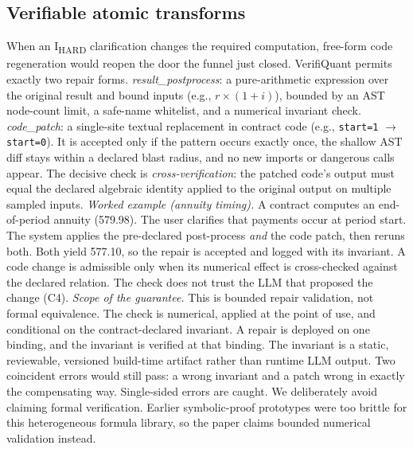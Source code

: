 \subsection{Verifiable atomic transforms}\label{sec:transforms}
When an I\textsubscript{HARD} clarification changes the required computation, free-form code regeneration would reopen the door the funnel just closed.
VerifiQuant permits exactly two repair forms.
\emph{result\_postprocess}: a pure-arithmetic expression over the original result and bound inputs (e.g., $r \times (1+i)$), bounded by an AST node-count limit, a safe-name whitelist, and a numerical invariant check.
\emph{code\_patch}: a single-site textual replacement in contract code (e.g., \texttt{start=1} $\rightarrow$ \texttt{start=0}).
It is accepted only if the pattern occurs exactly once, the shallow AST diff stays within a declared blast radius, and no new imports or dangerous calls appear.
The decisive check is \emph{cross-verification}: the patched code's output must equal the declared algebraic identity applied to the original output on multiple sampled inputs.
\emph{Worked example (annuity timing).} A contract computes an end-of-period annuity (579.98).
The user clarifies that payments occur at period start.
The system applies the pre-declared post-process \emph{and} the code patch, then reruns both.
Both yield 577.10, so the repair is accepted and logged with its invariant.
A code change is admissible only when its numerical effect is cross-checked against the declared relation.
The check does not trust the LLM that proposed the change (C4).
\emph{Scope of the guarantee.} This is bounded repair validation, not formal equivalence.
The check is numerical, applied at the point of use, and conditional on the contract-declared invariant.
A repair is deployed on one binding, and the invariant is verified at that binding.
The invariant is a static, reviewable, versioned build-time artifact rather than runtime LLM output.
Two coincident errors would still pass: a wrong invariant and a patch wrong in exactly the compensating way.
Single-sided errors are caught.
We deliberately avoid claiming formal verification.
Earlier symbolic-proof prototypes were too brittle for this heterogeneous formula library, so the paper claims bounded numerical validation instead.

